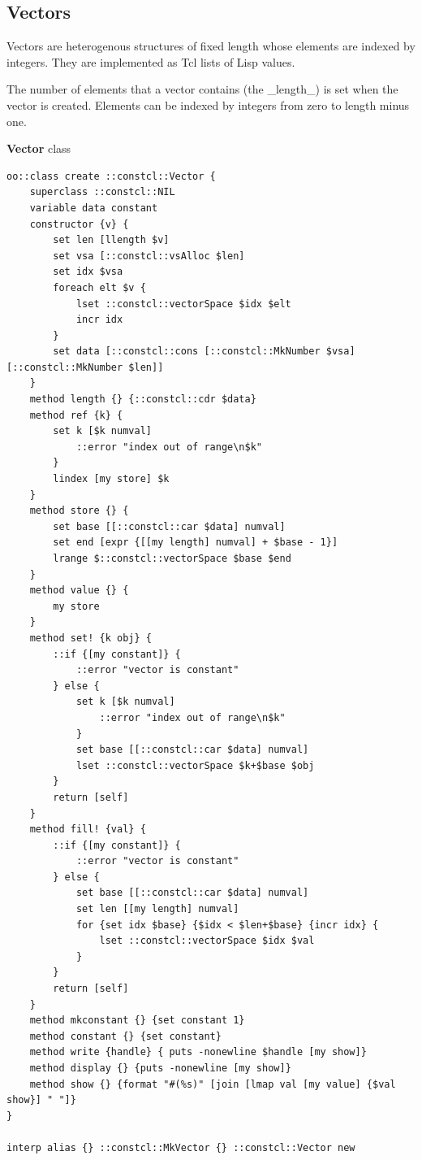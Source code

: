 \documentclass[twoside,9pt]{report}
\begin{document}
\subsection{Vectors}
\label{vectors}

Vectors are heterogenous structures of fixed length whose elements are indexed by integers. They are implemented as Tcl lists of Lisp values.


The number of elements that a vector contains (the \_length\_) is set when the vector is created. Elements can be indexed by integers from zero to length minus one.


\textbf{Vector} class

\noindent\makebox[\linewidth]{\rule{\linewidth}{0.4pt}}
\begin{lstlisting}
oo::class create ::constcl::Vector {
    superclass ::constcl::NIL
    variable data constant
    constructor {v} {
        set len [llength $v]
        set vsa [::constcl::vsAlloc $len]
        set idx $vsa
        foreach elt $v {
            lset ::constcl::vectorSpace $idx $elt
            incr idx
        }
        set data [::constcl::cons [::constcl::MkNumber $vsa] [::constcl::MkNumber $len]]
    }
    method length {} {::constcl::cdr $data}
    method ref {k} {
        set k [$k numval]
            ::error "index out of range\n$k"
        }
        lindex [my store] $k
    }
    method store {} {
        set base [[::constcl::car $data] numval]
        set end [expr {[[my length] numval] + $base - 1}]
        lrange $::constcl::vectorSpace $base $end
    }
    method value {} {
        my store
    }
    method set! {k obj} {
        ::if {[my constant]} {
            ::error "vector is constant"
        } else {
            set k [$k numval]
                ::error "index out of range\n$k"
            }
            set base [[::constcl::car $data] numval]
            lset ::constcl::vectorSpace $k+$base $obj
        }
        return [self]
    }
    method fill! {val} {
        ::if {[my constant]} {
            ::error "vector is constant"
        } else {
            set base [[::constcl::car $data] numval]
            set len [[my length] numval]
            for {set idx $base} {$idx < $len+$base} {incr idx} {
                lset ::constcl::vectorSpace $idx $val
            }
        }
        return [self]
    }
    method mkconstant {} {set constant 1}
    method constant {} {set constant}
    method write {handle} { puts -nonewline $handle [my show]}
    method display {} {puts -nonewline [my show]}
    method show {} {format "#(%s)" [join [lmap val [my value] {$val show}] " "]}
}
 
interp alias {} ::constcl::MkVector {} ::constcl::Vector new
\end{lstlisting}
\noindent\makebox[\linewidth]{\rule{\linewidth}{0.4pt}}
\end{document}
